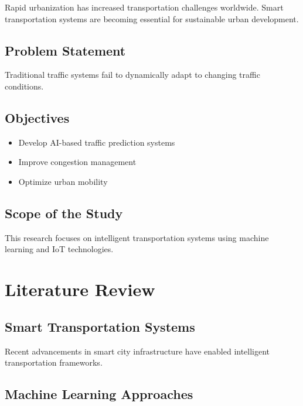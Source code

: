 \documentclass[12pt,a4paper]{report}
\begin{document}
	Rapid urbanization has increased transportation challenges worldwide. Smart transportation systems are becoming essential for sustainable urban development.
	
	\section{Problem Statement}
	
	Traditional traffic systems fail to dynamically adapt to changing traffic conditions.
	
	\section{Objectives}
	
	\begin{itemize}
		
		\item Develop AI-based traffic prediction systems
		
		\item Improve congestion management
		
		\item Optimize urban mobility
		
	\end{itemize}
	
	\section{Scope of the Study}
	
	This research focuses on intelligent transportation systems using machine learning and IoT technologies.
	
	
	\chapter{Literature Review}
	
	\section{Smart Transportation Systems}
	
	Recent advancements in smart city infrastructure have enabled intelligent transportation frameworks.
	
	\section{Machine Learning Approaches}
	
\end{document}

